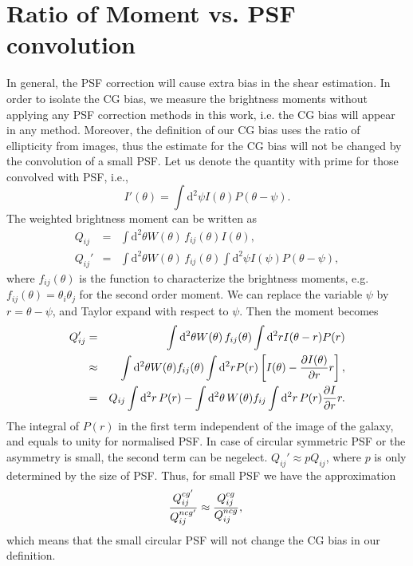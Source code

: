 \documentclass[useAMS,usenatbib]{mn2e}
\renewcommand{\d}{\mathrm{d}}
\newcommand{\bea}{\begin{eqnarray}}
\newcommand{\eea}{\end{eqnarray}}
\newcommand{\be}{\begin{equation}}
\newcommand{\ee}{\end{equation}}
\newcommand{\eck}[1]{\left[ #1 \right]}
\begin{document}
\appendix
\section{Ratio of Moment vs. PSF convolution}
In general, the PSF correction will cause extra bias in the shear
estimation.  In order to isolate the CG bias, we measure the
brightness moments without applying any PSF correction methods in this
work, i.e. the CG bias will appear in any method.  Moreover, the
definition of our CG bias uses the ratio of ellipticity from images,
thus the estimate for the CG bias will not be changed by the
convolution of a small PSF.  Let us denote the quantity with prime for
those convolved with PSF, i.e.,
%
\be
I'(\theta) = \int \d^2 \psi I(\theta) P(\theta-\psi).
\ee
%
The weighted brightness moment can be written as
%
\bea
Q_{ij} &=& \int \d^2 \theta W(\theta)\, f_{ij}(\theta) I(\theta ),\\
Q_{ij}' &=& \int \d^2 \theta W(\theta)\, f_{ij}(\theta)\int \d^2\psi I(\psi) P(\theta-\psi),
\eea
%
where $f_{ij}(\theta)$ is the function to characterize the brightness
moments, e.g. $f_{ij}(\theta)=\theta_i\theta_j$ for the second order
moment. We can replace the variable $\psi$ by $r=\theta-\psi$, and
Taylor expand with respect to $\psi$. Then the moment becomes
%
\bea
Q_{ij}' &=& \int \d^2 \theta W(\theta)\, f_{ij}(\theta) \int \d^2r I(\theta-r) P(r)\\
&\approx &\int \d^2 \theta W(\theta) f_{ij}(\theta) \int \d^2r P(r) \eck{I(\theta)-{\partial I(\theta) \over \partial r}r}, \nonumber \\
&=&Q_{ij} \int \d^2r\,P(r) - \int \d^2\theta\, W(\theta) f_{ij} \int \d^2r\, P(r) {\partial I\over \partial r}r.\nonumber
\eea
%
The integral of $P(r)$ in the first term independent of the image of
the galaxy, and equals to unity for normalised PSF. In case of
circular symmetric PSF or the asymmetry is small, the second term can
be negelect. $Q_{ij}'\approx p Q_{ij}$, where $p$ is only determined
by the size of PSF. Thus, for small PSF we have the approximation
%
\be
{Q^{cg'}_{ij} \over Q^{ncg'}_{ij}} \approx
{Q^{cg}_{ij} \over Q^{ncg}_{ij}}, \;
\ee
%
which means that the small circular PSF will not change the CG bias in
our definition.
%
%



\end{document}
